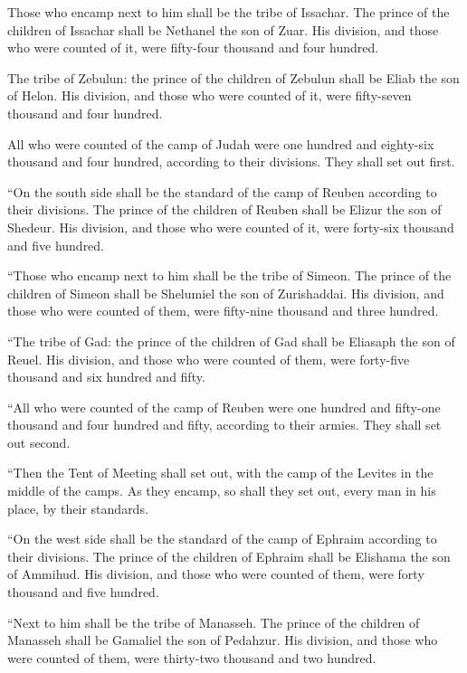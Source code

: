  Those who encamp next to him shall be the tribe of
Issachar. The prince of the children of Issachar shall be Nethanel the
son of Zuar.  His division, and those who were counted of
it, were fifty-four thousand and four hundred.

 The tribe of Zebulun: the prince of the children of Zebulun
shall be Eliab the son of Helon.  His division, and those
who were counted of it, were fifty-seven thousand and four hundred.

 All who were counted of the camp of Judah were one hundred
and eighty-six thousand and four hundred, according to their divisions.
They shall set out first.

 ``On the south side shall be the standard of the camp of
Reuben according to their divisions. The prince of the children of
Reuben shall be Elizur the son of Shedeur.  His division,
and those who were counted of it, were forty-six thousand and five
hundred.

 ``Those who encamp next to him shall be the tribe of
Simeon. The prince of the children of Simeon shall be Shelumiel the son
of Zurishaddai.  His division, and those who were counted
of them, were fifty-nine thousand and three hundred.

 ``The tribe of Gad: the prince of the children of Gad
shall be Eliasaph the son of Reuel.  His division, and
those who were counted of them, were forty-five thousand and six hundred
and fifty.

 ``All who were counted of the camp of Reuben were one
hundred and fifty-one thousand and four hundred and fifty, according to
their armies. They shall set out second.

 ``Then the Tent of Meeting shall set out, with the camp of
the Levites in the middle of the camps. As they encamp, so shall they
set out, every man in his place, by their standards.

 ``On the west side shall be the standard of the camp of
Ephraim according to their divisions. The prince of the children of
Ephraim shall be Elishama the son of Ammihud.  His
division, and those who were counted of them, were forty thousand and
five hundred.

 ``Next to him shall be the tribe of Manasseh. The prince
of the children of Manasseh shall be Gamaliel the son of Pedahzur.
 His division, and those who were counted of them, were
thirty-two thousand and two hundred.

